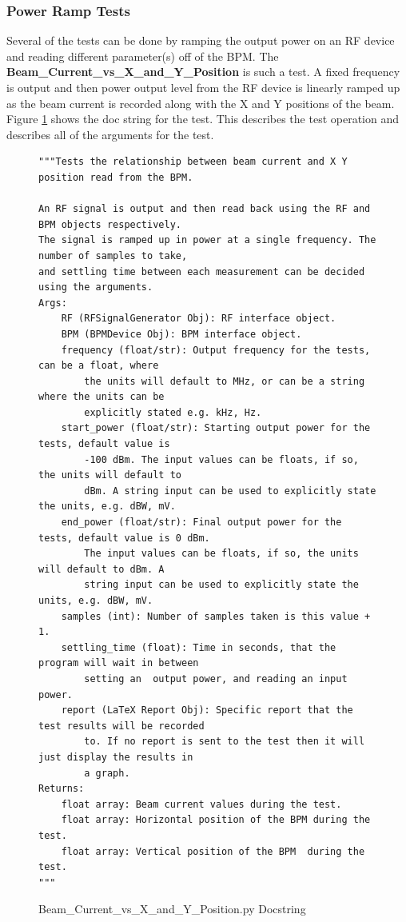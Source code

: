 \documentclass[a4paper, 11pt]{article}
\begin{document}
\subsubsection{Power Ramp Tests}
Several of the tests can be done by ramping the output power on an RF device and reading different parameter(s) off of the BPM. The \textbf{Beam\_Current\_vs\_X\_and\_Y\_Position} is such a test. A fixed frequency is output and then power output level from the RF device is linearly ramped up as the beam current is recorded along with the X and Y positions of the beam. Figure \ref{fig:BeamCurrentVsXYArguments.py} shows the doc string for the test. This describes the test operation and describes all of the arguments for the test. 

\begin{figure}[H]
\begin{verbatim}
"""Tests the relationship between beam current and X Y position read from the BPM.

An RF signal is output and then read back using the RF and BPM objects respectively. 
The signal is ramped up in power at a single frequency. The number of samples to take, 
and settling time between each measurement can be decided using the arguments. 
Args:
    RF (RFSignalGenerator Obj): RF interface object.
    BPM (BPMDevice Obj): BPM interface object.
    frequency (float/str): Output frequency for the tests, can be a float, where 
        the units will default to MHz, or can be a string where the units can be 
        explicitly stated e.g. kHz, Hz.
    start_power (float/str): Starting output power for the tests, default value is 
        -100 dBm. The input values can be floats, if so, the units will default to 
        dBm. A string input can be used to explicitly state the units, e.g. dBW, mV.
    end_power (float/str): Final output power for the tests, default value is 0 dBm.
        The input values can be floats, if so, the units will default to dBm. A 
        string input can be used to explicitly state the units, e.g. dBW, mV.
    samples (int): Number of samples taken is this value + 1.
    settling_time (float): Time in seconds, that the program will wait in between 
        setting an  output power, and reading an input power. 
    report (LaTeX Report Obj): Specific report that the test results will be recorded 
        to. If no report is sent to the test then it will just display the results in 
        a graph.
Returns:
    float array: Beam current values during the test. 
    float array: Horizontal position of the BPM during the test.
    float array: Vertical position of the BPM  during the test.
"""
\end{verbatim}
\caption{Beam\_Current\_vs\_X\_and\_Y\_Position.py Docstring}
\label{fig:BeamCurrentVsXYArguments.py}
\end{figure}
\end{document}
